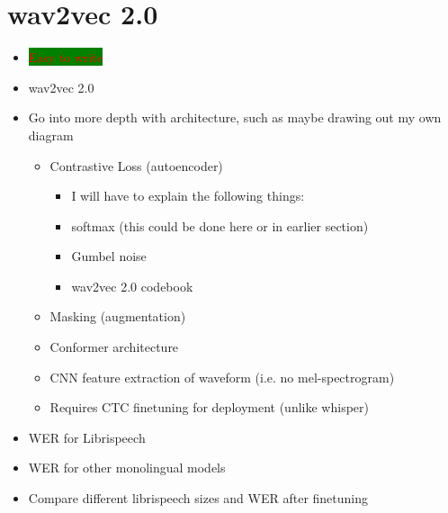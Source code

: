 


\section{wav2vec 2.0}\label{lr_sec:wav2vec2}
\iffalse
\begin{itemize}
    \item \colorbox{green}{\textcolor{red}{Easy to write}}
    \item wav2vec 2.0 \cite{wav2vec}
    \item Go into more depth with architecture, such as maybe drawing out my own diagram
    \begin{itemize}
        \item Contrastive Loss (autoencoder)
        \begin{itemize}
            \item I will have to explain the following things:
            \item softmax (this could be done here or in earlier section)
            \item Gumbel noise
            \item wav2vec 2.0 codebook
        \end{itemize}
        \item Masking (augmentation)
        \item Conformer architecture
        \item CNN feature extraction of waveform (i.e. no mel-spectrogram)
        \item Requires CTC finetuning for deployment (unlike whisper)
    \end{itemize}
    \item WER for Librispeech
    \item WER for other monolingual models
    \item Compare different librispeech sizes and WER after finetuning
    \begin{itemize}

\end{itemize}
\end{itemize}
